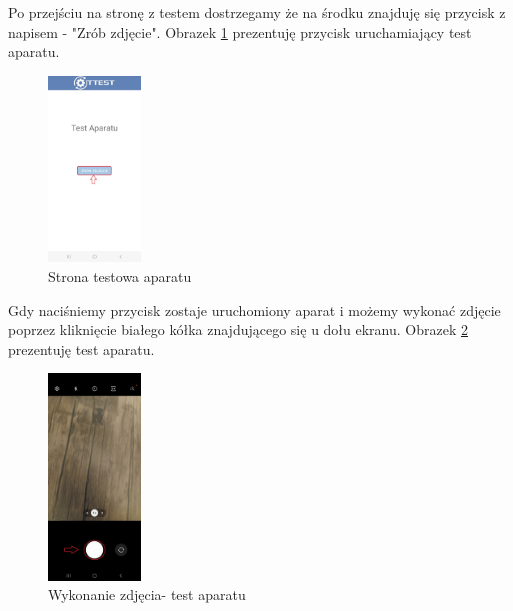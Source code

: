 Po przejściu na stronę z testem dostrzegamy że na środku znajduję się przycisk z napisem - "Zrób zdjęcie".
\newline
Obrazek \ref{rys:aparat} prezentuję przycisk uruchamiający test aparatu.

\begin{figure}[!hbt]
	\begin{center}
		\includegraphics[angle=360, width=0.22\textwidth]{rys/punkt6/aparat}
		\caption{Strona testowa aparatu}
		\label{rys:aparat}
	\end{center}
\end{figure}

\newpage


Gdy naciśniemy przycisk zostaje uruchomiony aparat i możemy wykonać zdjęcie poprzez kliknięcie białego kółka znajdującego się u dołu ekranu.
\newline
Obrazek \ref{rys:aparat1} prezentuję test aparatu.

\begin{figure}[!hbt]
	\begin{center}
		\includegraphics[angle=360, width=0.22\textwidth]{rys/punkt6/aparat1}
		\caption{Wykonanie zdjęcia- test aparatu}
		\label{rys:aparat1}
	\end{center}
\end{figure}

